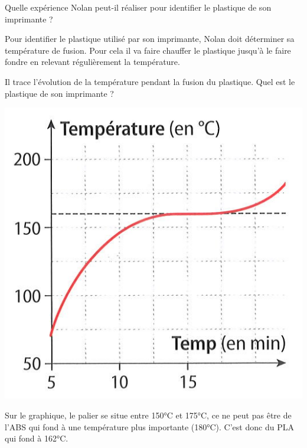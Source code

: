 \begin{questions}
	\question[2] Quelle expérience Nolan peut-il réaliser pour identifier le plastique de son imprimante ?

		\begin{solution}
			Pour identifier le plastique utilisé par son imprimante, Nolan doit déterminer sa température de fusion. Pour cela il va faire chauffer le plastique jusqu'à le faire fondre en relevant régulièrement la température.
		\end{solution}
	
	\question[2] Il trace l'évolution de la température pendant la fusion du plastique. Quel est le plastique de son imprimante ?
		\begin{center}
			\includegraphics[scale=0.45]{./img/courbe2}
		\end{center}

		\begin{solution}
			Sur le graphique, le palier se situe entre 150°C et 175°C, ce ne peut pas être de l'ABS qui fond à une température plus importante (180°C). C'est donc du PLA qui fond à 162°C.
		\end{solution}	


\end{questions}
